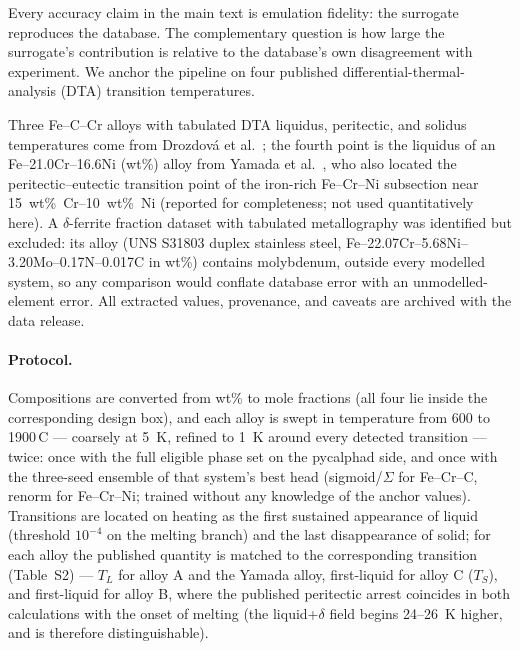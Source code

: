 \documentclass[11pt,a4paper]{article}
\begin{document}
Every accuracy claim in the main text is emulation fidelity: the surrogate
reproduces the database. The complementary question is how large the
surrogate's contribution is relative to the database's own disagreement
with experiment. We anchor the pipeline on four published
differential-thermal-analysis (DTA) transition temperatures.

Three Fe--C--Cr alloys with tabulated DTA liquidus, peritectic, and
solidus temperatures come from Drozdov\'a et al.\ \citep{drozdovs2017};
the fourth point is the liquidus of an Fe--21.0Cr--16.6Ni (wt\%) alloy
from Yamada et al.\ \citep{yamada1987}, who also located the
peritectic--eutectic transition point of the iron-rich Fe--Cr--Ni
subsection near 15~wt\%~Cr--10~wt\%~Ni (reported for completeness; not
used quantitatively here). A $\delta$-ferrite fraction dataset with
tabulated metallography was identified but excluded: its alloy (UNS
S31803 duplex stainless steel, Fe--22.07Cr--5.68Ni--3.20Mo--0.17N--0.017C
in wt\%) contains
molybdenum, outside every modelled system, so any comparison would
conflate database error with an unmodelled-element error. All extracted
values, provenance, and caveats are archived with the data release.

\paragraph{Protocol.}
Compositions are converted from wt\% to mole fractions (all four lie
inside the corresponding design box), and each alloy is swept in
temperature from 600 to 1900\,\textdegree C --- coarsely at 5~K, refined to 1~K
around every detected transition --- twice: once with the full eligible
phase set on the pycalphad side, and once with the three-seed ensemble of
that system's best head (sigmoid/$\Sigma$ for Fe--Cr--C, renorm for
Fe--Cr--Ni; trained without any knowledge of the anchor values).
Transitions are located on heating as the first sustained appearance of
liquid (threshold $10^{-4}$ on the melting branch) and the last
disappearance of solid; for each alloy the published quantity is matched
to the corresponding transition (Table~S2) --- $T_L$ for
alloy A and the Yamada
alloy, first-liquid for alloy C ($T_S$), and first-liquid for alloy B,
where the published peritectic arrest coincides in both calculations
with the onset of melting (the liquid+$\delta$ field begins 24--26~K
higher, and is therefore distinguishable).
\end{document}

